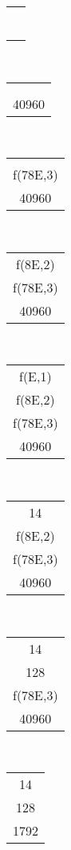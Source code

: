 \documentclass[a4paper, 11pt, oneside]{article}
\begin{document}
	\begin{center}
	
		\begin{tabular}{|c|}
			\\
			\\
			\\
			\textcolor{white}{--}\\
			\hline
		\end{tabular}~
		\begin{tabular}{|c|}
			\\
			\\
			\\
			40960\\
			\hline
		\end{tabular}~
		\begin{tabular}{|c|}
			\\
			\\
			f(78E,3)\\
			40960\\
			\hline
		\end{tabular}~
		\begin{tabular}{|c|}
			\\
			f(8E,2)\\
			f(78E,3)\\
			40960\\
			\hline
		\end{tabular}~
		\begin{tabular}{|c|}
			f(E,1)\\
			f(8E,2)\\
			f(78E,3)\\
			40960\\
			\hline
		\end{tabular}~
		\begin{tabular}{|c|}
			14\\
			f(8E,2)\\
			f(78E,3)\\
			40960\\
			\hline
		\end{tabular}~
		\begin{tabular}{|c|}
			14\\
			128\\
			f(78E,3)\\
			40960\\
			\hline
		\end{tabular}~
		\begin{tabular}{|c|}
			14\\
			128\\
			1792\\

\end{tabular}
\end{center}
\end{document}
